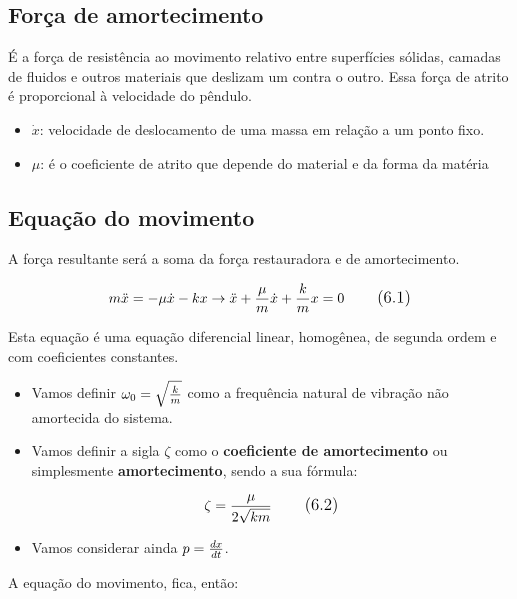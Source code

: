 \subsection{Força de amortecimento}
É a força de resistência ao movimento relativo entre superfícies sólidas, camadas de fluidos e outros materiais que deslizam um contra o outro. Essa força de atrito é proporcional à velocidade do pêndulo.
\begin{itemize}
\item $\dot{x}$:  velocidade de deslocamento de uma massa em relação a um ponto fixo.
\item $\mu$: é o coeficiente de atrito que depende do material e da forma da matéria
\end{itemize}

\subsection{Equação do movimento}

A força resultante será a soma da força restauradora e de amortecimento.

\begin{equation}
\large m \ddot{x} = -\mu \dot{x} -kx \rightarrow \ddot{x} + \frac{\mu}{m}\dot{x} + \frac{k}{m}x = 0
\tag{6.1}
\end{equation}
	
Esta equação é uma equação diferencial linear, homogênea, de segunda ordem e com coeficientes constantes. 

\begin{itemize}

\item Vamos definir $\large \omega _{0} = \sqrt{\frac{k}{m}}$ como a frequência natural de vibração não amortecida do sistema.

\item Vamos definir a sigla $\zeta$ como o \textbf{coeficiente de amortecimento} ou simplesmente \textbf{amortecimento}, sendo a sua fórmula:

\begin{equation}
\large \zeta = \frac{\mu}{2\sqrt{km}} 
\tag{6.2}
\end{equation}

\item Vamos considerar ainda $\large p = \frac{dx}{dt}$.

\end{itemize}

A equação do movimento, fica, então:

